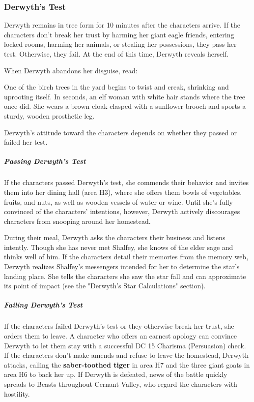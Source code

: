\documentclass[10pt,a4paper,twoside,bg=print,twocolumn,openany,nodeprecatedcode]{dndbook}
\begin{document}
\subsubsection{Derwyth's Test}
Derwyth remains in tree form for 10 minutes after the characters arrive. If the characters don't break her trust by harming her giant eagle friends, entering locked rooms, harming her animals, or stealing her possessions, they pass her test. Otherwise, they fail. At the end of this time, Derwyth reveals herself.

When Derwyth abandons her disguise, read:

\begin{DndReadAloud}{}
One of the birch trees in the yard begins to twist and creak, shrinking and uprooting itself. In seconds, an elf woman with white hair stands where the tree once did. She wears a brown cloak clasped with a sunflower brooch and sports a sturdy, wooden prosthetic leg.

\end{DndReadAloud}

Derwyth's attitude toward the characters depends on whether they passed or failed her test.

\subparagraph{Passing Derwyth's Test}
If the characters passed Derwyth's test, she commends their behavior and invites them into her dining hall (area H3), where she offers them bowls of vegetables, fruits, and nuts, as well as wooden vessels of water or wine. Until she's fully convinced of the characters' intentions, however, Derwyth actively discourages characters from snooping around her homestead.

During their meal, Derwyth asks the characters their business and listens intently. Though she has never met Shalfey, she knows of the elder sage and thinks well of him. If the characters detail their memories from the memory web, Derwyth realizes Shalfey's messengers intended for her to determine the star's landing place. She tells the characters she saw the star fall and can approximate its point of impact (see the "Derwyth's Star Calculations" section).

\subparagraph{Failing Derwyth's Test}
If the characters failed Derwyth's test or they otherwise break her trust, she orders them to leave. A character who offers an earnest apology can convince Derwyth to let them stay with a successful DC 15 Charisma (Persuasion) check. If the characters don't make amends and refuse to leave the homestead, Derwyth attacks, calling the \textbf{saber-toothed tiger} in area H7 and the three giant goats in area H6 to back her up. If Derwyth is defeated, news of the battle quickly spreads to Beasts throughout Cernant Valley, who regard the characters with hostility.
\end{document}
